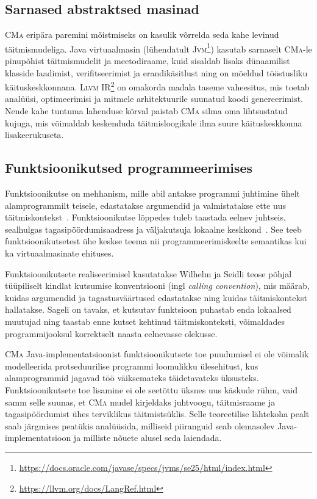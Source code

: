 \subsection{Sarnased abstraktsed masinad}\label{taust:sarnased}

\textsc{CMa} eripära paremini mõistmiseks on kasulik võrrelda seda kahe levinud täitmismudeliga. Java virtuaalmasin (lühendatult \textsc{Jvm}\footnote{\url{https://docs.oracle.com/javase/specs/jvms/se25/html/index.html}}) kasutab sarnaselt \textsc{CMa}-le pinupõhist täitmismudelit ja meetodiraame, kuid sisaldab lisaks dünaamilist klasside laadimist, verifitseerimist ja erandikäsitlust ning on mõeldud tööstusliku käituskeskkonnana. \textsc{Llvm} IR\footnote{\url{https://llvm.org/docs/LangRef.html}} on omakorda madala taseme vaheesitus, mis toetab analüüsi, optimeerimisi ja mitmele arhitektuurile suunatud koodi genereerimist. Nende kahe tuntuma lahenduse kõrval paistab \textsc{CMa} silma oma lihtsustatud kujuga, mis võimaldab keskenduda täitmisloogikale ilma suure käituskeskkonna lisakeerukuseta.

\subsection{Funktsioonikutsed programmeerimises}\label{taust:funktsioonikutsed}

Funktsioonikutse on mehhanism, mille abil antakse programmi juhtimine ühelt alamprogrammilt teisele, edastatakse argumendid ja valmistatakse ette uus täitmiskontekst~\cite{gabbrielli_programming_2023}. Funktsioonikutse lõppedes tuleb taastada eelnev juhtseis, sealhulgas tagasipöördumisaadress ja väljakutsuja lokaalne keskkond~\cite{mogensen_programming_2026}. See teeb funktsioonikutsetest ühe keskse teema nii programmeerimiskeelte semantikas kui ka virtuaalmasinate ehituses. 

Funktsioonikutsete realiseerimisel kasutatakse Wilhelm ja Seidli teose põhjal~\cite{wilhelm_imperative_2010} tüüpiliselt kindlat kutsumise konventsiooni (ingl \emph{calling convention}), mis määrab, kuidas argumendid ja tagastusväärtused edastatakse ning kuidas täitmiskontekst hallatakse. Sageli on tavaks, et kutsutav funktsioon puhastab enda lokaalsed muutujad ning taastab enne kutset kehtinud täitmiskonteksti, võimaldades programmijooksul korrektselt naasta eelnevasse olekusse.

\textsc{CMa} Java-implementatsioonist funktsioonikutsete toe puudumisel ei ole võimalik modelleerida protseduurilise programmi loomulikku ülesehitust, kus alamprogrammid jagavad töö väiksemateks täidetavateks üksusteks. Funktsioonikutsete toe lisamine ei ole seetõttu üksnes uus käskude rühm, vaid samm selle suunas, et \textsc{CMa} mudel kirjeldaks juhtvoogu, täitmisraame ja tagasipöördumist ühes terviklikus täitmistsüklis. Selle teoreetilise lähtekoha pealt saab järgmises peatükis analüüsida, milliseid piiranguid seab olemasolev Java-implementatsioon ja milliste nõuete alusel seda laiendada.
